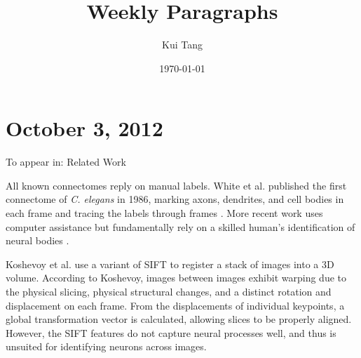 \documentclass{article}
\begin{document}
\title{Weekly Paragraphs}
\author{Kui Tang}
\date{\today}
\maketitle
\section*{October 3, 2012}
To appear in: Related Work

All known connectomes reply on manual labels. White et al. published the first connectome of \emph{C. elegans} in 1986, marking axons, dendrites, and cell bodies in each frame and tracing the labels through frames \cite{White12111986}. More recent work uses computer assistance but fundamentally rely on a skilled human's identification of neural bodies \cite{Jarrell2012,Bock2011Roberts2011}.

Koshevoy et al. \cite{Koshevoy2006} use a variant of SIFT \cite{Lowe2004} to register a stack of images into a 3D volume. According to Koshevoy, images between images exhibit warping due to the physical slicing, physical structural changes, and a distinct rotation and displacement on each frame. From the displacements of individual keypoints, a global transformation vector is calculated, allowing slices to be properly aligned. However, the SIFT features do not capture neural processes well, and thus is unsuited for identifying neurons across images.



\end{document}
